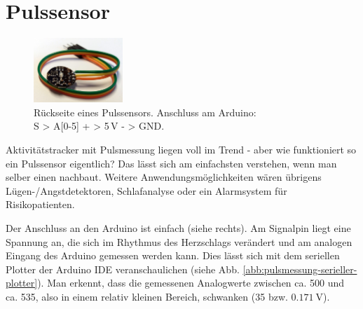 \newpage
\section{Pulssensor}\label{sec:pulssensor}

\begin{figure}
	\centering
	\vspace{-\baselineskip}
	\includegraphics[width=0.3\textwidth]{./pics/pulssensor.jpg}
	\caption{Rückseite eines Pulssensors. Anschluss am Arduino: \\S > A[0-5] \qquad + > 5\,V \qquad - > GND.}
\end{figure}
Aktivitätstracker mit Pulsmessung liegen voll im Trend - aber wie funktioniert so ein Pulssensor eigentlich? Das lässt sich am einfachsten verstehen, wenn man selber einen nachbaut. Weitere Anwendungsmöglichkeiten wären übrigens Lügen-/Angstdetektoren, Schlafanalyse oder ein Alarmsystem für Risikopatienten.

Der Anschluss an den Arduino ist einfach (siehe rechts). Am Signalpin liegt eine Spannung an, die sich im Rhythmus des Herzschlags verändert und am analogen Eingang des Arduino gemessen werden kann. Dies lässt sich mit dem seriellen Plotter der Arduino IDE veranschaulichen (siehe Abb. \ref{abb:pulsmessung-serieller-plotter}). Man erkennt, dass die gemessenen Analogwerte zwischen ca. 500 und ca. 535, also in einem relativ kleinen Bereich, schwanken (35 bzw. $\SI{0,171}{\volt}$).

